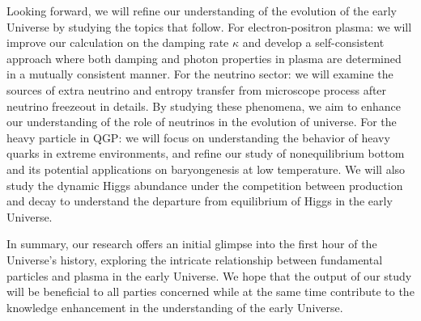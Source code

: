 Looking forward, we will refine our understanding of the evolution of the early Universe by studying the topics that follow. For electron-positron plasma: we will improve our calculation on the damping rate $\kappa$ and develop a self-consistent approach where both damping and photon properties in plasma are determined in a mutually consistent manner. For the neutrino sector: we will examine the sources of extra neutrino and entropy transfer from microscope process after neutrino freezeout in details. 
By studying these phenomena, we aim to enhance our understanding of the role of neutrinos in the evolution of universe. For the heavy particle in QGP: we will focus on understanding the behavior of heavy quarks in extreme environments, and refine our study of nonequilibrium bottom and its potential applications on baryongenesis at low temperature. We will also study the dynamic Higgs abundance under the competition between production and decay to understand the departure from equilibrium of Higgs in the early Universe.


In summary, our research offers an initial glimpse into the first hour of the Universe's history, exploring the intricate relationship between fundamental particles and plasma in the early Universe. We hope that the output of our study will be beneficial to all parties concerned while at the same time contribute to the knowledge enhancement in the understanding of the early Universe.

